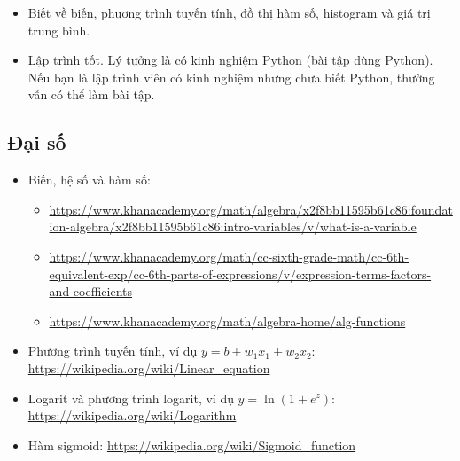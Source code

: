\documentclass[12pt,a4paper]{article}
\newcommand{\mlccurl}[1]{\url{#1}}
\begin{document}
\begin{dinhnghia}[title={Yêu cầu nền tảng tối thiểu}]
\begin{itemize}
  \item Biết về biến, phương trình tuyến tính, đồ thị hàm số, histogram và giá trị trung bình.
  \item Lập trình tốt. Lý tưởng là có kinh nghiệm Python (bài tập dùng Python). Nếu bạn là lập trình viên có kinh nghiệm nhưng chưa biết Python, thường vẫn có thể làm bài tập.
\end{itemize}
\end{dinhnghia}

\subsection{Đại số}

\begin{phuongphap}[title={Các chủ đề đại số cần nắm}]
\begin{itemize}
  \item Biến, hệ số và hàm số:
  \begin{itemize}
    \item \mlccurl{https://www.khanacademy.org/math/algebra/x2f8bb11595b61c86:foundation-algebra/x2f8bb11595b61c86:intro-variables/v/what-is-a-variable}
    \item \mlccurl{https://www.khanacademy.org/math/cc-sixth-grade-math/cc-6th-equivalent-exp/cc-6th-parts-of-expressions/v/expression-terms-factors-and-coefficients}
    \item \mlccurl{https://www.khanacademy.org/math/algebra-home/alg-functions}
  \end{itemize}

  \item Phương trình tuyến tính, ví dụ \(y = b + w_1x_1 + w_2x_2\):
  \mlccurl{https://wikipedia.org/wiki/Linear_equation}

  \item Logarit và phương trình logarit, ví dụ \(y = \ln(1 + e^{z})\):
  \mlccurl{https://wikipedia.org/wiki/Logarithm}

  \item Hàm sigmoid:
  \mlccurl{https://wikipedia.org/wiki/Sigmoid_function}
\end{itemize}
\end{phuongphap}
\end{document}
